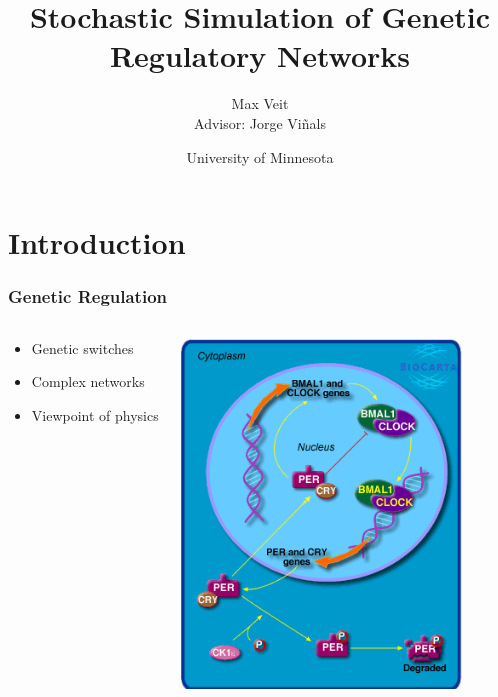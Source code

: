 \documentclass[xcolor={usenames,dvipsnames,svgnames}]{beamer}
\begin{document}
\title[Genetic Networks]{Stochastic Simulation of Genetic Regulatory Networks}
\author[Max Veit]{Max Veit\\Advisor: Jorge Viñals}
\date[2014-05-07{7 May 2014}
\institute[U of MN]{University of Minnesota}
\subject{Physics}

\frame{\titlepage}

\section{Introduction} %
\label{sec:introduction}
\begin{frame}
    \frametitle{Genetic Regulation}
    \begin{columns}[t]
        \begin{column}[t]{0.5\textwidth}
            \begin{itemize}
                \item Genetic switches
                \item Complex networks
                \item Viewpoint of physics
            \end{itemize}
        \end{column}
        \begin{column}[T]{0.5\textwidth}
            \includegraphics[width=0.85\textwidth]{h_circadianPathway.png} \footnotesize{\cite{biocarta}}
        \end{column}
    \end{columns}
\end{frame}
\end{document}
